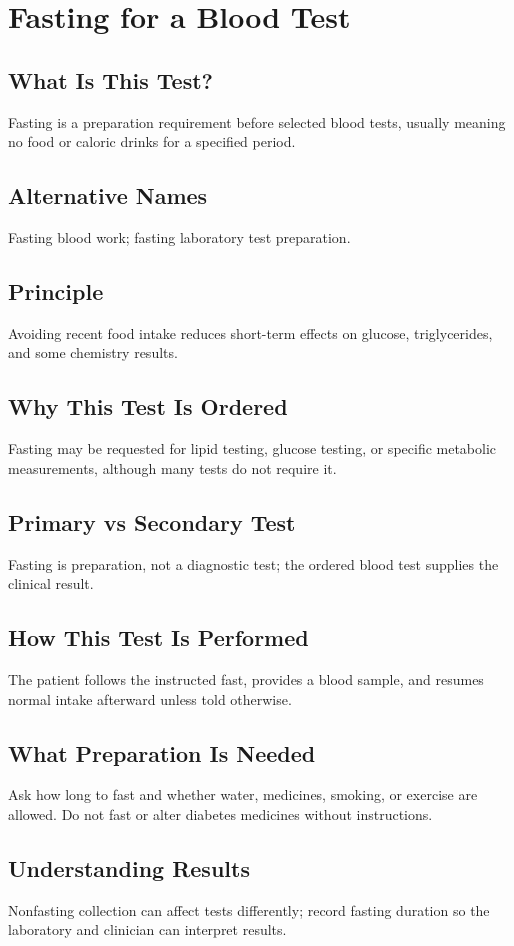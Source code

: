 \chapter{Fasting for a Blood Test}
\section*{What Is This Test?} Fasting is a preparation requirement before selected blood tests, usually meaning no food or caloric drinks for a specified period.
\section*{Alternative Names} Fasting blood work; fasting laboratory test preparation.
\section*{Principle} Avoiding recent food intake reduces short-term effects on glucose, triglycerides, and some chemistry results.
\section*{Why This Test Is Ordered} Fasting may be requested for lipid testing, glucose testing, or specific metabolic measurements, although many tests do not require it.
\section*{Primary vs Secondary Test} Fasting is preparation, not a diagnostic test; the ordered blood test supplies the clinical result.
\section*{How This Test Is Performed} The patient follows the instructed fast, provides a blood sample, and resumes normal intake afterward unless told otherwise.
\section*{What Preparation Is Needed} Ask how long to fast and whether water, medicines, smoking, or exercise are allowed. Do not fast or alter diabetes medicines without instructions.
\section*{Understanding Results} Nonfasting collection can affect tests differently; record fasting duration so the laboratory and clinician can interpret results.

